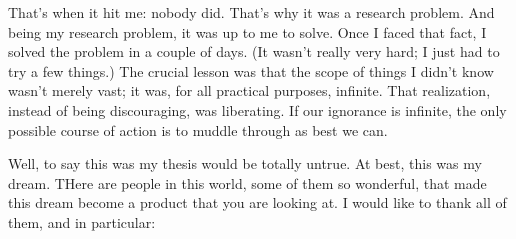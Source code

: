 That's when it hit me: nobody did. That's why it was a research problem. And being my research problem, it was
up to me to solve. Once I faced that fact, I solved the problem in a couple of days. (It wasn't really very
hard; I just had to try a few things.) The crucial lesson was that the scope of things I didn't know wasn't
merely vast; it was, for all practical purposes, infinite. That realization, instead of being discouraging, was
liberating. If our ignorance is infinite, the only possible course of action is to muddle through as best we
can.

Well, to say this was my thesis would be totally untrue. At best, this was my dream. THere are people in this
world, some of them so wonderful, that made this dream become a product that you are looking at. I would like to
thank all of them, and in particular:






